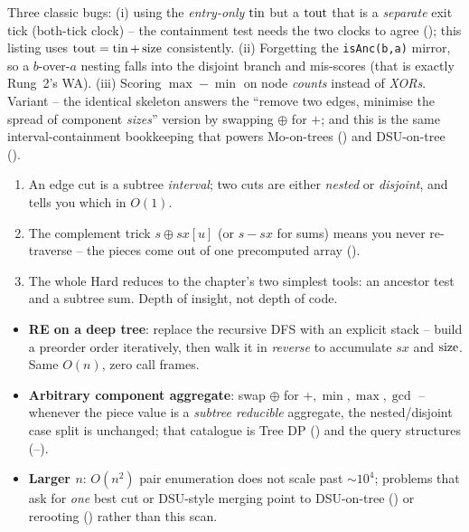 \begin{warningbox}
Three classic bugs: (i) using the \emph{entry-only} $\operatorname{tin}$ but a $\operatorname{tout}$ that is a
\emph{separate} exit tick (both-tick clock) -- the containment test needs the two clocks to agree
(); this listing uses $\operatorname{tout}=\operatorname{tin}+\operatorname{size}$ consistently. (ii) Forgetting the
\texttt{isAnc(b,a)} mirror, so a $b$-over-$a$ nesting falls into the disjoint branch and
mis-scores (that is exactly Rung~2's WA). (iii) Scoring $\max-\min$ on node \emph{counts} instead
of \emph{XORs}. Variant -- the identical skeleton answers the ``remove two edges, minimise the
spread of component \emph{sizes}'' version by swapping $\oplus$ for $+$; and this is the same
interval-containment bookkeeping that powers Mo-on-trees () and DSU-on-tree ().
\end{warningbox}

\begin{insightbox}
\begin{enumerate}[nosep, leftmargin=1.6em]
  \item An edge cut is a subtree \emph{interval}; two cuts are either \emph{nested} or
        \emph{disjoint}, and  tells you which in $O(1)$.
  \item The complement trick $s\oplus\mathit{sx}[u]$ (or $s-\mathit{sx}$ for sums) means you
        never re-traverse -- the pieces come out of one precomputed array ().
  \item The whole Hard reduces to the chapter's two simplest tools: an ancestor test and a
        subtree sum. Depth of insight, not depth of code.
\end{enumerate}
\end{insightbox}

\begin{hardeningbox}
\begin{itemize}[nosep, leftmargin=1.4em]
  \item \textbf{RE on a deep tree}: replace the recursive DFS with an explicit
         stack -- build a preorder order iteratively, then walk it in
        \emph{reverse} to accumulate $\mathit{sx}$ and $\operatorname{size}$. Same $O(n)$, zero call frames.
  \item \textbf{Arbitrary component aggregate}: swap $\oplus$ for $+,\min,\max,\gcd$ -- whenever
        the piece value is a \emph{subtree reducible} aggregate, the nested/disjoint case split
        is unchanged; that catalogue is Tree DP () and the query structures
        (--).
  \item \textbf{Larger $n$}: $O(n^2)$ pair enumeration does not scale past $\sim10^4$; problems
        that ask for \emph{one} best cut or DSU-style merging point to DSU-on-tree
        () or rerooting () rather than this scan.
\end{itemize}
\end{hardeningbox}

